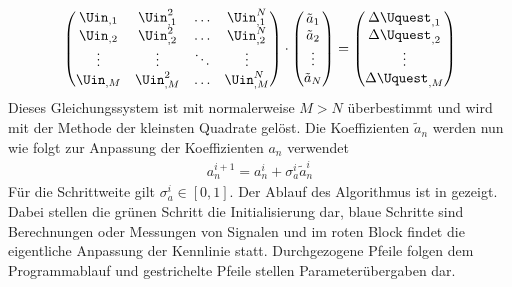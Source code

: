\documentclass[../Report.tex]{subfiles}
\begin{document}
\begin{align}
	\left( 
	\begin{matrix}
	 	\Uin_{,1} & \Uin_{,1}^2 & \dots & \Uin_{,1}^N \\
		\Uin_{,2} & \Uin_{,2}^2 & \dots & \Uin_{,2}^N \\
		\vdots & \vdots & \ddots & \vdots \\
		\Uin_{,M} & \Uin_{,M}^2 & \dots & \Uin_{,M}^N \\
	\end{matrix}
	\right)
	\cdot
	\left(
	\begin{matrix}
		\tilde{a}_1 \\
		\tilde{a}_2 \\
		\vdots \\
		\tilde{a}_N \\	 
	\end{matrix}
	\right) = \left( 
	\begin{matrix}
		\Delta \Uquest_{,1} \\
		\Delta \Uquest_{,2} \\
		\vdots \\
		\Delta \Uquest_{,M} \\	 
	\end{matrix}
	\right)
	\label{eq:Uquest.Gleichungssystem}
\end{align}
Dieses Gleichungssystem ist mit normalerweise $M>N$ überbestimmt und wird mit der Methode der kleinsten Quadrate gelöst. Die Koeffizienten $\tilde{a}_n$ werden nun wie folgt zur Anpassung der Koeffizienten $a_n$ verwendet
\begin{align}
	\label{eq:opt.adjusta}
	a_n^{i+1} = a_n^{i} + \sigma_{a}^{i} \tilde{a}_n^{i}
\end{align}
Für die Schrittweite gilt $\sigma_{a}^i \in \left[ 0 , 1 \right]$. Der Ablauf des Algorithmus ist in  gezeigt. Dabei stellen die grünen Schritt die Initialisierung dar, blaue Schritte sind Berechnungen oder Messungen von Signalen und im roten Block findet die eigentliche Anpassung der Kennlinie statt. Durchgezogene Pfeile folgen dem Programmablauf und gestrichelte Pfeile stellen Parameterübergaben dar.
\end{document}
